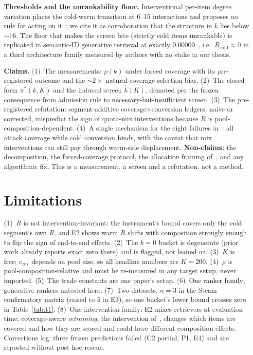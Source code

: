 \documentclass[sigconf,anonymous,review]{acmart}
\begin{document}
\textbf{Thresholds and the unrankability floor.} Interventional per-item degree variation places the cold-warm transition at 6--15 interactions and proposes no rule for acting on it~\cite{warm}; we cite it as corroboration that the structure in $k$ lies below $\sim$16. The floor that makes the screen bite (strictly cold items unrankable) is replicated in semantic-ID generative retrieval at exactly 0.00000~\cite{sidcold}, i.e.\ $R_{\mathrm{cold}}\approx 0$ in a third architecture family measured by authors with no stake in our thesis.

\textbf{Claims.} (1)~The measurements: $\rho(k)$ under forced coverage with its pre-registered outcome and the $\sim 2\times$ natural-coverage selection bias. (2)~The closed form $\pi^*(k,K)$ and the induced screen $\hat k(K)$, demoted per the frozen consequence from admission rule to necessary-but-insufficient screen. (3)~The pre-registered refutation: segment-additive coverage$\times$conversion ledgers, naive or corrected, mispredict the sign of quota-mix interventions because $R$ is pool-composition-dependent. (4)~A single mechanism for the eight failures in~\cite{bottleneck}: all attack coverage while cold conversion binds, with the caveat that mix interventions can still pay through warm-side displacement. \textbf{Non-claims:} the decomposition, the forced-coverage protocol, the allocation framing of~\cite{capts}, and any algorithmic fix. This is a measurement, a screen and a refutation, not a method.

\section{Limitations}
(1)~$R$ is not intervention-invariant: the instrument's bound covers only the cold segment's own $R$, and E2 shows warm $R$ shifts with composition strongly enough to flip the sign of end-to-end effects. (2)~The $k{=}0$ bucket is degenerate (prior work already reports exact zero there) and is flagged, not leaned on. (3)~$K$ is free; $c_{\mathrm{cov}}$ depends on pool size, so all headline numbers are $K{=}200$. (4)~$\rho$ is pool-composition-relative and must be re-measured in any target setup, never imported. (5)~The trade constants are one paper's setup. (6)~One ranker family; generative rankers untested here. (7)~Two datasets, $n{=}3$ in the Steam confirmatory matrix (raised to 5 in E3), so one bucket's lower bound crosses zero in Table~\ref{tab:t1}. (8)~One intervention family: E2 mixes retrievers at evaluation time; coverage-aware \emph{retraining}, the intervention of~\cite{bottleneck}, changes which items are covered and how they are scored and could have different composition effects. Corrections log: three frozen predictions failed (C2 partial, P1, E4) and are reported without post-hoc rescue.
\end{document}
